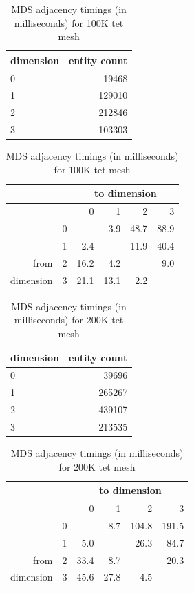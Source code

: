 \begin{table}
\caption{MDS adjacency timings (in milliseconds) for 100K tet mesh}
\label{tab:mds_adj_100}
\begin{center}
\begin{tabular}{l|r|}
dimension & entity count \\\hline
0 & 19468 \\
1 & 129010 \\
2 & 212846 \\
3 & 103303 \\
\end{tabular}
\begin{tabular}{|r|r|r r r r}
               &   & \multicolumn{4}{c}{to dimension} \\\hline
               &   &    0 &    1 &    2 &   3  \\\hline
               & 0 &      &  3.9 & 48.7 & 88.9 \\
               & 1 &  2.4 &      & 11.9 & 40.4 \\
from           & 2 & 16.2 &  4.2 &      &  9.0 \\
dimension      & 3 & 21.1 & 13.1 &  2.2 &      \\
\end{tabular}
\end{center}
\end{table}

\begin{table}
\caption{MDS adjacency timings (in milliseconds) for 200K tet mesh}
\label{tab:mds_adj_200}
\begin{center}
\begin{tabular}{l|r|}
dimension & entity count \\\hline
0 & 39696  \\
1 & 265267 \\
2 & 439107 \\
3 & 213535 \\
\end{tabular}
\begin{tabular}{|r|r|r r r r}
               &   & \multicolumn{4}{c}{to dimension} \\\hline
               &   &    0 &    1 &     2 &     3 \\\hline
               & 0 &      &  8.7 & 104.8 & 191.5 \\
               & 1 &  5.0 &      &  26.3 &  84.7 \\
from           & 2 & 33.4 &  8.7 &       &  20.3 \\
dimension      & 3 & 45.6 & 27.8 &   4.5 &       \\
\end{tabular}
\end{center}
\end{table}

